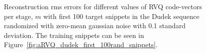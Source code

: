 								\begin{figure}[h]
								\centering
								\subtable{\begin{tiny}\end{tiny}}
								\caption{Reconstruction rms errors for different values of RVQ code-vectors per stage, $m$ with first 100 target snippets in the Dudek sequence randomized with zero-mean gaussian noise with 0.1 standard deviation.  The training snippets can be seen in Figure~\ref{fig:aRVQ_dudek_first_100rand_snippets}.}
								\label{fig:aRVQ_Dudek_first_100_rand}
								\end{figure}





%





\clearpage
\newpage
\normalsize


